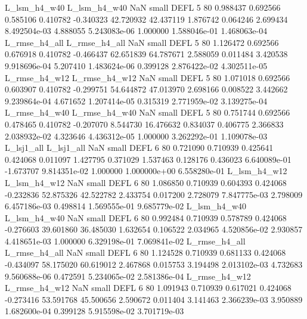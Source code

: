  L_lsm_h4_w40  L_lsm_h4_w40                   NaN      small     DEFL                 5 80 0.988437       0.692566 0.585106       0.410782   -0.340323     42.720932     42.437119     1.876742       0.064246  2.699434 8.492504e-03     4.888055   5.243083e-06            1.000000    1.588046e-01        1.468063e-04
L_rmse_h4_all L_rmse_h4_all                   NaN      small     DEFL                 5 80 1.126472       0.692566 0.676918       0.410782   -0.466437     62.651839     64.787671     2.588059       0.011484  3.420538 9.918696e-04     5.207410   1.483624e-06            0.399128    2.876422e-02        4.302511e-05
L_rmse_h4_w12 L_rmse_h4_w12                   NaN      small     DEFL                 5 80 1.071018       0.692566 0.603907       0.410782   -0.299751     54.644872     47.013970     2.698166       0.008522  3.442662 9.239864e-04     4.671652   1.207414e-05            0.315319    2.771959e-02        3.139275e-04
L_rmse_h4_w40 L_rmse_h4_w40                   NaN      small     DEFL                 5 80 0.751744       0.692566 0.478465       0.410782   -0.207070      8.544730     16.476632     0.834037       0.406775  2.366833 2.038932e-02     4.323646   4.436312e-05            1.000000    3.262292e-01        1.109078e-03
   L_lsj1_all    L_lsj1_all                   NaN      small     DEFL                 6 80 0.721090       0.710939 0.425641       0.424068    0.011097      1.427795      0.371029     1.537463       0.128176  0.436023 6.640089e-01    -1.673707   9.814351e-02            1.000000    1.000000e+00        6.558280e-01
 L_lsm_h4_w12  L_lsm_h4_w12                   NaN      small     DEFL                 6 80 1.086850       0.710939 0.604393       0.424068   -0.232836     52.875326     42.522782     2.433754       0.017200  2.728079 7.847775e-03     2.798009   6.457186e-03            0.498814    1.569555e-01        9.685779e-02
 L_lsm_h4_w40  L_lsm_h4_w40                   NaN      small     DEFL                 6 80 0.992484       0.710939 0.578789       0.424068   -0.276603     39.601860     36.485030     1.632654       0.106522  2.034965 4.520856e-02     2.930857   4.418651e-03            1.000000    6.329198e-01        7.069841e-02
L_rmse_h4_all L_rmse_h4_all                   NaN      small     DEFL                 6 80 1.124528       0.710939 0.681133       0.424068   -0.434097     58.175020     60.619012     2.467868       0.015753  3.194498 2.013102e-03     4.732683   9.560688e-06            0.472591    5.234065e-02        2.581386e-04
L_rmse_h4_w12 L_rmse_h4_w12                   NaN      small     DEFL                 6 80 1.091943       0.710939 0.617021       0.424068   -0.273416     53.591768     45.500656     2.590672       0.011404  3.141463 2.366239e-03     3.950889   1.682600e-04            0.399128    5.915598e-02        3.701719e-03
